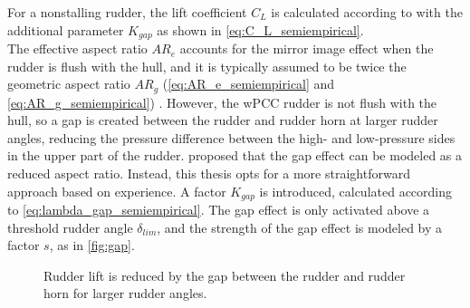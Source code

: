 For a nonstalling rudder, the lift coefficient $C_L$ is calculated according to \textcite{whickerFreeStreamCharacteristicsFamily1958} with the additional parameter $K_{gap}$ as shown in \autoref{eq:C_L_semiempirical}.
\begin{equation}
    \label{eq:C_L_semiempirical}
    
\end{equation}
%
\begin{equation}
    \label{eq:alpha_semiempirical}
    
\end{equation}
The effective aspect ratio $AR_e$ accounts for the mirror image effect when the rudder is flush with the hull, and it is typically assumed to be twice the geometric aspect ratio $AR_g$ (\autoref{eq:AR_e_semiempirical} and \autoref{eq:AR_g_semiempirical}) \cite{hughesTEMPESTLevel0Theory2011}.
However, the wPCC rudder is not flush with the hull, so a gap is created between the rudder and rudder horn at larger rudder angles, reducing the pressure difference between the high- and low-pressure sides in the upper part of the rudder. \textcite{matusiakDynamicsRigidShip2021} proposed that the gap effect can be modeled as a reduced aspect ratio. Instead, this thesis opts for a more straightforward approach based on experience. A factor $K_{gap}$ is introduced, calculated according to \autoref{eq:lambda_gap_semiempirical}. The gap effect is only activated above a threshold rudder angle $\delta_{lim}$, and the strength of the gap effect is modeled by a factor $s$, as in \autoref{fig:gap}.
%
\begin{equation}
    \label{eq:AR_g_semiempirical}
    
\end{equation}
%
\begin{equation}
    \label{eq:AR_e_semiempirical}
    
\end{equation}
%
\begin{equation}
    \label{eq:lambda_gap_semiempirical}
    
\end{equation}
\begin{figure}[h]
    \centering
    
    \caption{Rudder lift is reduced by the gap between the rudder and rudder horn for larger rudder angles.}
    \label{fig:gap}
\end{figure}
\FloatBarrier

